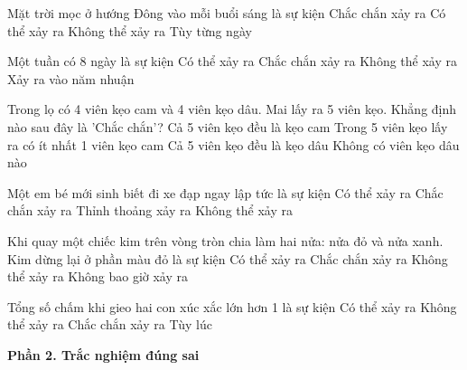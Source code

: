 \begin{ex} %
Mặt trời mọc ở hướng Đông vào mỗi buổi sáng là sự kiện
\choice
{\True Chắc chắn xảy ra}
{Có thể xảy ra}
{Không thể xảy ra}
{Tùy từng ngày}
\end{ex}

\begin{ex} %
Một tuần có 8 ngày là sự kiện
\choice
{Có thể xảy ra}
{Chắc chắn xảy ra}
{\True Không thể xảy ra}
{Xảy ra vào năm nhuận}
\end{ex}

\begin{ex} %
Trong lọ có 4 viên kẹo cam và 4 viên kẹo dâu. Mai lấy ra 5 viên kẹo. Khẳng định nào sau đây là 'Chắc chắn'?
\choice
{Cả 5 viên kẹo đều là kẹo cam}
{\True Trong 5 viên kẹo lấy ra có ít nhất 1 viên kẹo cam}
{Cả 5 viên kẹo đều là kẹo dâu}
{Không có viên kẹo dâu nào}
\end{ex}

\begin{ex} %
Một em bé mới sinh biết đi xe đạp ngay lập tức là sự kiện
\choice
{Có thể xảy ra}
{Chắc chắn xảy ra}
{Thỉnh thoảng xảy ra}
{\True Không thể xảy ra}
\end{ex}

\begin{ex} %
Khi quay một chiếc kim trên vòng tròn chia làm hai nửa: nửa đỏ và nửa xanh. Kim dừng lại ở phần màu đỏ là sự kiện
\choice
{\True Có thể xảy ra}
{Chắc chắn xảy ra}
{Không thể xảy ra}
{Không bao giờ xảy ra}
\end{ex}

\begin{ex} %
Tổng số chấm khi gieo hai con xúc xắc lớn hơn 1 là sự kiện
\choice
{Có thể xảy ra}
{Không thể xảy ra}
{\True Chắc chắn xảy ra}
{Tùy lúc}
\end{ex}

\textbf{Phần 2. Trắc nghiệm đúng sai}

